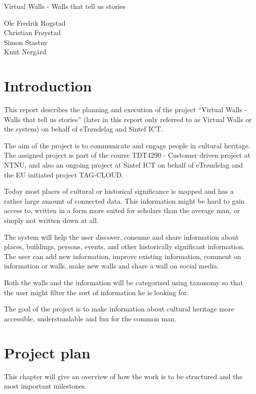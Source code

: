 \documentclass[11pt]{book}
\begin{document}
\frontmatter

\begingroup
\thispagestyle{empty}
\centering
\vspace*{9cm}
\par\normalfont\fontsize{35}{35}\sffamily\selectfont
Virtual Walls - Walls that tell us stories\par
\vspace*{1cm}
{\Huge Ole Fredrik Rogstad\\Christian Frøystad\\Simon Stastny\\Knut Nergård}\par
\endgroup

\tableofcontents

\mainmatter
\chapter{Introduction}
This report describes the planning and execution of the project ``Virtual Walls - Walls that tell us stories'' (later in this report only referred to as Virtual Walls or the system) on behalf of eTrøndelag and Sintef ICT.

The aim of the project is to communicate and engage people in cultural heritage. The assigned project is part of the course TDT4290 - Customer driven project at NTNU, and also an ongoing project at Sintef ICT on behalf of eTrøndelag and the EU initiated project TAG-CLOUD.

Today most places of cultural or historical significance is mapped and has a rather large amount of connected data. This information might be hard to gain access to, written in a form more suited for scholars than the average man, or simply not written down at all.

The system will help the user discover, consume and share information about places, buildings, persons, events, and other historically significant information. The user can add new information, improve existing information, comment on information or walls, make new walls and share a wall on social media.

Both the walls and the information will be categorized using taxonomy so that the user might filter the sort of information he is looking for.

The goal of the project is to make information about cultural heritage more accessible, understandable and fun for the common man.

\chapter{Project plan}
This chapter will give an overview of how the work is to be structured and the most important milestones.
\end{document}
